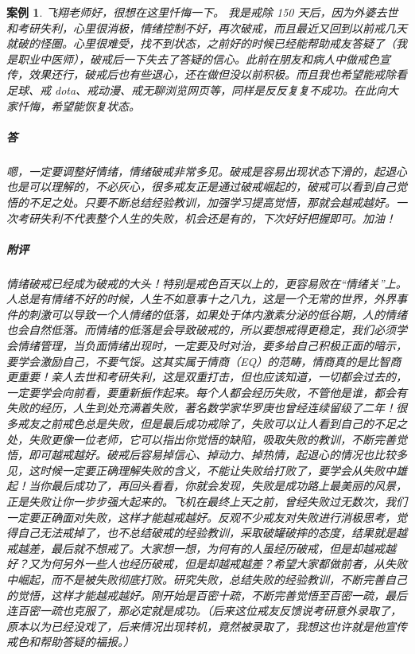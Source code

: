 \documentclass{ctexart}
\newtheorem{case}{案例}
\begin{document}
\begin{case}
    飞翔老师好，很想在这里忏悔一下。 我是戒除 150 天后，因为外婆去世和考研失利，心里很消极，情绪控制不好，再次破戒，而且最近又回到以前戒几天就破的怪圈。心里很难受，找不到状态，之前好的时候已经能帮助戒友答疑了（我是职业中医师），破戒后一下失去了答疑的信心。此前在朋友和病人中做戒色宣传，效果还行，破戒后也有些退心，还在做但没以前积极。而且我也希望能戒除看足球、戒 dota、戒动漫、戒无聊浏览网页等，同样是反反复复不成功。在此向大家忏悔，希望能恢复状态。
    \subparagraph{答} 嗯，一定要调整好情绪，情绪破戒非常多见。破戒是容易出现状态下滑的，起退心也是可以理解的，不必灰心，很多戒友正是通过破戒崛起的，破戒可以看到自己觉悟的不足之处。只要不断总结经验教训，加强学习提高觉悟，那就会越戒越好。一次考研失利不代表整个人生的失败，机会还是有的，下次好好把握即可。加油！
    \subparagraph{附评} 情绪破戒已经成为破戒的大头！特别是戒色百天以上的，更容易败在“情绪关”上。人总是有情绪不好的时候，人生不如意事十之八九，这是一个无常的世界，外界事件的刺激可以导致一个人情绪的低落，如果处于体内激素分泌的低谷期，人的情绪也会自然低落。而情绪的低落是会导致破戒的，所以要想戒得更稳定，我们必须学会情绪管理，当负面情绪出现时，一定要及时对治，要多给自己积极正面的暗示，要学会激励自己，不要气馁。这其实属于情商（EQ）的范畴，情商真的是比智商更重要！亲人去世和考研失利，这是双重打击，但也应该知道，一切都会过去的，一定要学会向前看，要重新振作起来。每个人都会经历失败，不管他是谁，都会有失败的经历，人生到处充满着失败，著名数学家华罗庚也曾经连续留级了二年！很多戒友之前戒色总是失败，但是最后成功戒除了，失败可以让人看到自己的不足之处，失败更像一位老师，它可以指出你觉悟的缺陷，吸取失败的教训，不断完善觉悟，即可越戒越好。破戒后容易掉信心、掉动力、掉热情，起退心的情况也比较多见，这时候一定要正确理解失败的含义，不能让失败给打败了，要学会从失败中雄起！当你最后成功了，再回头看看，你就会发现，失败是成功路上最美丽的风景，正是失败让你一步步强大起来的。飞机在最终上天之前，曾经失败过无数次，我们一定要正确面对失败，这样才能越戒越好。反观不少戒友对失败进行消极思考，觉得自己无法戒掉了，也不总结破戒的经验教训，采取破罐破摔的态度，结果就是越戒越差，最后就不想戒了。大家想一想，为何有的人虽经历破戒，但是却越戒越好？又为何另外一些人也经历破戒，但是却越戒越差？希望大家都做前者，从失败中崛起，而不是被失败彻底打败。研究失败，总结失败的经验教训，不断完善自己的觉悟，这样才能越戒越好。刚开始是百密十疏，不断完善觉悟至百密一疏，最后连百密一疏也克服了，那必定就是成功。（后来这位戒友反馈说考研意外录取了，原本以为已经没戏了，后来情况出现转机，竟然被录取了，我想这也许就是他宣传戒色和帮助答疑的福报。）
\end{case}
\end{document}
